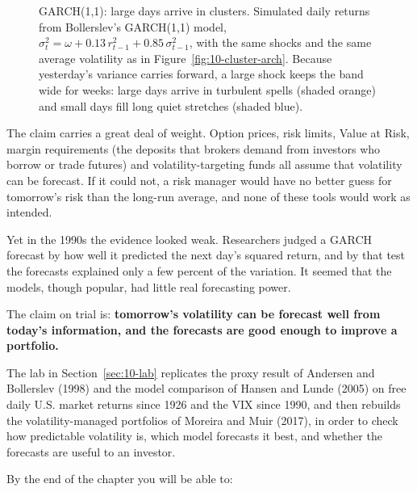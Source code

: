 \begin{figure}[htbp]
\caption[GARCH(1,1): large days arrive in clusters]{GARCH(1,1): large days arrive in clusters. Simulated daily returns from Bollerslev's GARCH(1,1) model, $\sigma_t^2 = \omega + 0.13\,r_{t-1}^2 + 0.85\,\sigma_{t-1}^2$, with the same shocks and the same average volatility as in Figure~\ref{fig:10-cluster-arch}. Because yesterday's variance carries forward, a large shock keeps the band wide for weeks: large days arrive in turbulent spells (shaded orange) and small days fill long quiet stretches (shaded blue).}
\label{fig:10-cluster-garch}
\end{figure}


The claim carries a great deal of weight. Option prices, risk limits, Value at Risk, margin requirements (the deposits that brokers demand from investors who borrow or trade futures) and volatility-targeting funds all assume that volatility can be forecast. If it could not, a risk manager would have no better guess for tomorrow's risk than the long-run average, and none of these tools would work as intended.

Yet in the 1990s the evidence looked weak. Researchers judged a GARCH forecast by how well it predicted the next day's squared return, and by that test the forecasts explained only a few percent of the variation. It seemed that the models, though popular, had little real forecasting power.

The claim on trial is: \textbf{tomorrow's volatility can be forecast well from today's information, and the forecasts are good enough to improve a portfolio.}

The lab in Section~\ref{sec:10-lab} replicates the proxy result of Andersen and Bollerslev (1998) and the model comparison of Hansen and Lunde (2005) on free daily U.S. market returns since 1926 and the VIX since 1990, and then rebuilds the volatility-managed portfolios of Moreira and Muir (2017), in order to check how predictable volatility is, which model forecasts it best, and whether the forecasts are useful to an investor.

By the end of the chapter you will be able to:

